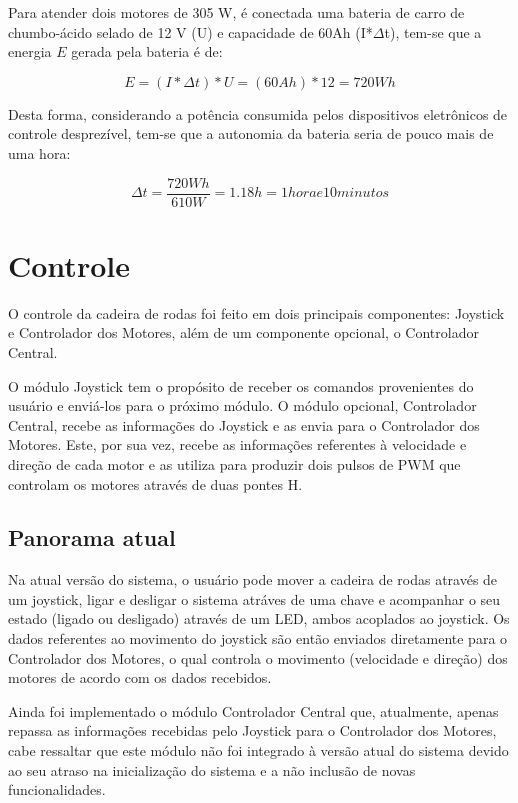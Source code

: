 		Para atender dois motores de 305 W, é conectada uma bateria de carro de chumbo-ácido selado de 12 V (U) e capacidade de 60Ah (I*$\Delta$t), tem-se que a energia $E$ gerada pela bateria é de:

		\begin{equation}
			E = (I*\Delta t)*U = (60Ah)*12 = 720Wh
		\end{equation}

		Desta forma, considerando a potência consumida pelos dispositivos eletrônicos de controle desprezível, tem-se que a autonomia da bateria seria de pouco mais de uma hora:

		\begin{equation}
			\Delta t = \frac{720 Wh}{610 W} = 1.18 h = 1 hora e 10 minutos
		\end{equation}

\section{Controle}

	O controle da cadeira de rodas foi feito em dois principais componentes: Joystick e Controlador dos Motores, além de um componente opcional, o Controlador Central.

	O módulo Joystick tem o propósito de receber os comandos provenientes do usuário e enviá-los para o próximo módulo. O módulo opcional, Controlador Central, recebe as informações do Joystick e as envia para o Controlador dos Motores. Este, por sua vez, recebe as informações referentes à velocidade e direção de cada motor e as utiliza para produzir dois pulsos de PWM que controlam os motores através de duas pontes H.

	\subsection{Panorama atual}

		Na atual versão do sistema, o usuário pode mover a cadeira de rodas através de um joystick, ligar e desligar o sistema atráves de uma chave e acompanhar o seu estado (ligado ou desligado) através de um LED, ambos acoplados ao joystick. Os dados referentes ao movimento do joystick são então enviados diretamente para o Controlador dos Motores, o qual controla o movimento (velocidade e direção) dos motores de acordo com os dados recebidos.

		Ainda foi implementado o módulo Controlador Central que, atualmente, apenas repassa as informações recebidas pelo Joystick para o Controlador dos Motores, cabe ressaltar que este módulo não foi integrado à versão atual do sistema devido ao seu atraso na inicialização do sistema e a não inclusão de novas funcionalidades.

